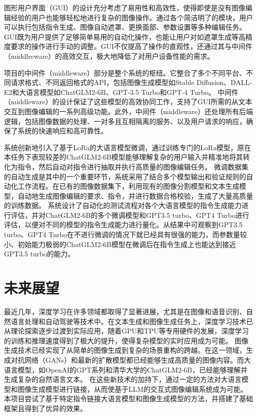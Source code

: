 \documentclass[a4paper,AutoFakeBold,oneside,12pt]{book}
\begin{document}
图形用户界面（GUI）的设计充分考虑了易用性和高效性，使得即使是没有图像编辑经验的用户也能够轻松地进行复杂的图像操作。通过各个简洁明了的模块，用户可以执行包括指令生成、图像自动遮罩、更换面部、参数设置等多种编辑任务。
GUI既为用户提供了足够简单易用的自动化操作，也能让用户对如遮罩生成等高精度要求的操作进行手动的调整。GUI不仅提高了操作的直观性，还通过其与中间件（middlreware）的高效交互，极大地降低了对用户设备性能的需求。

项目的中间件（middleware）部分是整个系统的枢纽。它整合了多个不同平台、不同请求格式、不同返回格式的API，包括图像生成模型如Stable Diffusion、DALL-E2和大语言模型如ChatGLM2-6B、GPT-3.5 Turbo和GPT-4 Turbo。
中间件（middleware）的设计保证了这些模型的高效协同工作，支持了GUI所需的从文本交互到图像编辑的一系列高级功能。此外，中间件（middleware）还处理所有后端逻辑，包括图像数据的处理、一对多且互相隔离的服务、以及用户请求的响应，确保了系统的快速响应和高可靠性。

系统创新地引入了基于LoRa的大语言模型微调，通过训练专门的LoRa模型，原在本任务下表现较差的ChatGLM2-6B模型能够理解复杂的用户输入并精准地将其转化为指令，然后自动对指令进行抽取并执行高质量的图像编辑任务。
微调数据集的自动生成是其中的一个重要环节，系统采用了结合多个模型输出和验证规则的自动化工作流程。在已有的图像数据集下，利用现有的图像分割模型和文本生成模型，自动地生成图像编辑的要求、指令，并进行数据合格校验，生成了大量高质量的训练数据。
系统设计了自动化的测试流程对各个大语言模型的指令生成能力进行评估，并对ChatGLM2-6B的多个微调模型和GPT3.5 turbo、GPT4 Turbo进行评估，以便对不同的模型的指令生成能力进行量化。从结果中可观察到GPT3.5 turbo、GPT4 Turbo在不进行微调的情况下就已经具有很强的能力，而参数量较小、初始能力极弱的ChatGLM2-6B模型在微调后在指令生成上也能达到接近GPT3.5 turbo的能力。

\section{未来展望}
最近几年，深度学习在许多领域都取得了显著进展，尤其是在图像和语音识别、自然语言处理和自动驾驶等技术中。在文本生成和图像生成任务上，深度学习技术已从理论探索逐步过渡到实际应用，随着GPU和TPU等专用硬件的发展，深度学习的训练和推理速度得到了极大的提升，使得复杂模型的实时应用成为可能。
图像生成技术已经实现了从简单的图像生成到复杂的场景重构的跨越。在这一领域，生成对抗网络（GANs）和最新的扩散模型都已经能够生成高质量的图像内容。而大语言模型，如OpenAI的GPT系列和清华大学的ChatGLM2-6B，已经能够理解并生成复杂的自然语言文本。
在这些新技术的加持下，通过一定的方法对大语言模型和图像生成模型进行链接，从而使基于LLM的交互式图像编辑系统成为可能。
本项目尝试了基于特定指令链接大语言模型和图像生成模型的方法，并搭建了基础框架且得到了优异的效果。
\end{document}

